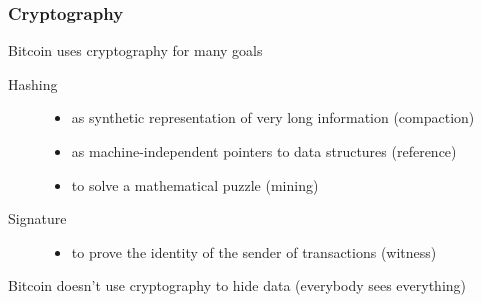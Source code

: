 \documentclass[11pt]{beamer}  %
\begin{document}
\begin{frame}\frametitle{Cryptography}

  \begin{greenbox}{Bitcoin uses cryptography for many goals}
    \begin{description}
      \item[Hashing]
        \begin{itemize}
        \item as synthetic representation of very long information (compaction)
        \item as machine-independent pointers to data structures (reference)
        \item to solve a mathematical puzzle (mining)
        \end{itemize}
        \bigskip
      \item[Signature]
        \begin{itemize}
        \item to prove the identity of the sender of transactions (witness)
        \end{itemize}
    \end{description}
  \end{greenbox}

  \bigskip

  \begin{redbox}{}
    Bitcoin doesn't use cryptography to hide data
    (everybody sees everything)
  \end{redbox}

\end{frame}
\end{document}
